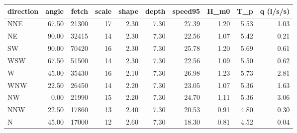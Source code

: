 \begin{tabular}{lrrrrrrrrr}
\toprule
direction & angle & fetch & scale & shape & depth & speed95 & H_m0 & T_p & q (l/s/s) \\
\midrule
NNE & 67.50 & 21300 & 17 & 2.30 & 7.30 & 27.39 & 1.20 & 5.53 & 1.03 \\
NE & 90.00 & 32415 & 14 & 2.30 & 7.30 & 22.56 & 1.07 & 5.42 & 0.21 \\
SW & 90.00 & 70420 & 16 & 2.30 & 7.30 & 25.78 & 1.20 & 5.69 & 0.61 \\
WSW & 67.50 & 51500 & 14 & 2.30 & 7.30 & 22.56 & 1.09 & 5.50 & 0.62 \\
W & 45.00 & 35430 & 16 & 2.10 & 7.30 & 26.98 & 1.23 & 5.73 & 2.81 \\
WNW & 22.50 & 26450 & 14 & 2.20 & 7.30 & 23.05 & 1.07 & 5.36 & 1.63 \\
NW & 0.00 & 21990 & 15 & 2.20 & 7.30 & 24.70 & 1.11 & 5.36 & 3.06 \\
NNW & 22.50 & 17860 & 13 & 2.40 & 7.30 & 20.53 & 0.91 & 4.80 & 0.30 \\
N & 45.00 & 17000 & 12 & 2.60 & 7.30 & 18.30 & 0.81 & 4.52 & 0.04 \\
\bottomrule
\end{tabular}
